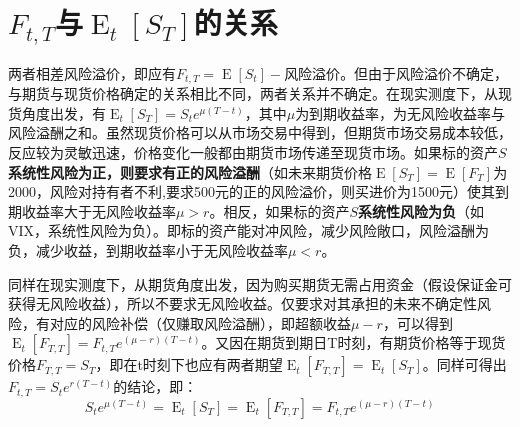 \documentclass[11pt]{article}
\newcommand{\E}{\operatorname{E}}
\begin{document}
\section{$F_{t,T}$与$\E_t[S_T]$的关系}
两者相差风险溢价，即应有$F_{t,T}=\E[S_t]-\text{风险溢价}$。但由于风险溢价不确定，与期货与现货价格确定的关系相比不同，两者关系并不确定。在现实测度下，从现货角度出发，有$\E_t[S_T]=S_t e^{\mu(T-t)}$，其中$\mu$为到期收益率，为无风险收益率与风险溢酬之和。虽然现货价格可以从市场交易中得到，但期货市场交易成本较低，反应较为灵敏迅速，价格变化一般都由期货市场传递至现货市场。如果标的资产$S$\textbf{系统性风险为正，则要求有正的风险溢酬}（如未来期货价格$\E[S_T]=\E[F_T]$为2000，风险对持有者不利,要求500元的正的风险溢价，则买进价为1500元）使其到期收益率大于无风险收益率$\mu>r$。相反，如果标的资产$S$\textbf{系统性风险为负}（如VIX，系统性风险为负）。即标的资产能对冲风险，减少风险敞口，风险溢酬为负，减少收益，到期收益率小于无风险收益率$\mu<r$。

同样在现实测度下，从期货角度出发，因为购买期货无需占用资金（假设保证金可获得无风险收益），所以不要求无风险收益。仅要求对其承担的未来不确定性风险，有对应的风险补偿（仅赚取风险溢酬），即超额收益$\mu-r$，可以得到$\E_t[F_{T,T}] = F_{t,T} e^{(\mu-r)(T-t)}$。又因在期货到期日T时刻，有期货价格等于现货价格$F_{T,T} = S_T$，即在t时刻下也应有两者期望$\E_t[F_{T,T}] = \E_t[S_T]$。同样可得出$F_{t,T} = S_t e^{r(T-t)}$的结论，即：
\begin{equation*}
    S_t e^{\mu(T-t)} = \E_t[S_T] = \E_t[F_{T,T}] = F_{t,T} e^{(\mu-r)(T-t)}
\end{equation*}
\end{document}
